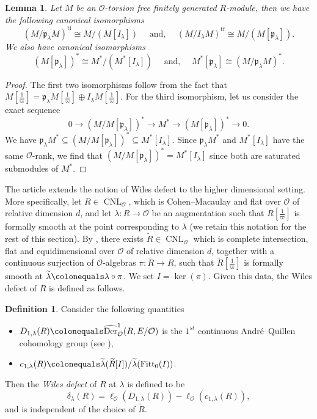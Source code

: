 \documentclass[a4paper, notitlepage, 10pt]{amsart}
\theoremstyle{plain} %
\newtheorem{lemma}[theorem]{Lemma}
\theoremstyle{definition} %
\newtheorem{definition}[theorem]{Definition}
\theoremstyle{remark} %
\numberwithin{equation}{section}
\newcommand{\CNL}{\operatorname{CNL}}
\newcommand{\Der}{\operatorname{Der}} %
\newcommand{\Fitt}{\operatorname{Fitt}} %
\newcommand{\tf}{\operatorname{tf}} %
\begin{document}
\begin{lemma}\label{quotientsiso}
    Let $M$ be an $\mathcal{O}$-torsion free finitely generated $R$-module, then we have the following canonical isomorphisms
    $$ (M/\mathfrak{p}_\lambda M)^{\tf} \cong M/(M[I_\lambda]) \quad \text{ and, } \quad (M/I_\lambda M)^{\tf}\cong M/(M[\mathfrak{p}_\lambda]).$$
    We also have canonical isomorphisms
    $$ (M[\mathfrak{p}_\lambda])^*\cong M^*/(M^*[I_\lambda]) \quad \text{ and, } \quad M^*[\mathfrak{p}_\lambda]\cong (M/\mathfrak{p_\lambda}M)^*. $$
\end{lemma}

\begin{proof} The first two isomorphisms follow from the fact that $M[\tfrac{1}{\varpi}]=\mathfrak{p}_\lambda M[\tfrac{1}{\varpi}]\oplus I_\lambda M[\tfrac{1}{\varpi}]$.
For the third isomorphism, let us consider the exact sequence
$$ 0 \to (M/M[\mathfrak{p}_{\lambda}])^* \to M^* \to (M[\mathfrak{p}_\lambda])^*\to 0. $$
We have $\mathfrak{p}_\lambda M^*\subseteq (M/M[\mathfrak{p}_{\lambda}])^* \subseteq M^*[I_\lambda]$. Since $\mathfrak{p}_\lambda M^*$ and $M^*[I_\lambda]$ have the same $\mathcal{O}$-rank, we find that $(M/M[\mathfrak{p}_{\lambda}])^* = M^*[I_\lambda]$ since both are saturated submodules of $M^*$.
\end{proof}
The article \cite{BKM2} extends the notion of Wiles defect to the higher dimensional setting. More specifically, let $R\in \CNL_{\mathcal{O}}$, which is Cohen--Macaulay and flat over $\mathcal{O}$ of relative dimension $d$, and let $\lambda\colon R\to \mathcal{O}$ be an augmentation such that $ R[\tfrac{1}{\varpi}]$ is formally smooth at the point corresponding to $\lambda$ (we retain this notation for the rest of this section). By \cite[Proposition 3.3]{BKM2}, there exists $\widetilde{R}\in \CNL_{\mathcal{O}}$ which is complete intersection, flat and equidimensional over $\mathcal{O}$ of relative dimension $d$, together with a continuous surjection of $\mathcal{O}$-algebras $\pi \colon \widetilde{R}\to R$, such that $\widetilde{R}[\tfrac{1}{\varpi}]$ is formally smooth at $\widetilde{\lambda}\colonequals \lambda\circ \pi$. We set $I=\ker(\pi)$. Given this data, the Wiles defect of $R$ is defined as follows.
\begin{definition}\label{originaldefwilesdefect}
Consider the following quantities
   \begin{itemize}
       \item $D_{1,\lambda}(R)\colonequals \widehat{\Der}^1_{\mathcal{O}}(R,E/\mathcal{O})$ is the $1^{st}$ continuous André--Quillen cohomology group (see \cite[\S 3.3]{BKM2}), 
       \item $c_{1,\lambda}(R)\colonequals \widetilde{\lambda}(\widetilde{R}[I])/\widetilde{\lambda}(\Fitt_0(I))$.
   \end{itemize}
   Then the \emph{Wiles defect} of $R$ at $\lambda$ is defined to be
   $$ \delta_\lambda(R)= \ell_{\mathcal{O}}\left(D_{1,\lambda}(R)\right)- \ell_{\mathcal{O}}\left(c_{1,\lambda}(R)\right), $$
   and is independent of the choice of $\widetilde{R}$.
\end{definition}
\end{document}

